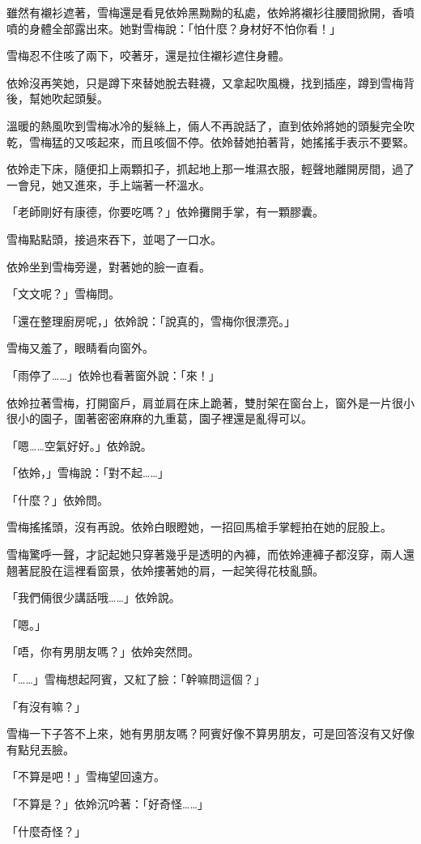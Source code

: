 雖然有襯衫遮著，雪梅還是看見依姈黑黝黝的私處，依姈將襯衫往腰間掀開，香噴噴的身體全部露出來。她對雪梅說：「怕什麼？身材好不怕你看！」

雪梅忍不住咳了兩下，咬著牙，還是拉住襯衫遮住身體。

依姈沒再笑她，只是蹲下來替她脫去鞋襪，又拿起吹風機，找到插座，蹲到雪梅背後，幫她吹起頭髮。

溫暖的熱風吹到雪梅冰冷的髮絲上，倆人不再說話了，直到依姈將她的頭髮完全吹乾，雪梅猛的又咳起來，而且咳個不停。依姈替她拍著背，她搖搖手表示不要緊。

依姈走下床，隨便扣上兩顆扣子，抓起地上那一堆濕衣服，輕聲地離開房間，過了一會兒，她又進來，手上端著一杯溫水。

「老師剛好有康德，你要吃嗎？」依姈攤開手掌，有一顆膠囊。

雪梅點點頭，接過來吞下，並喝了一口水。

依姈坐到雪梅旁邊，對著她的臉一直看。

「文文呢？」雪梅問。

「還在整理廚房呢，」依姈說：「說真的，雪梅你很漂亮。」

雪梅又羞了，眼睛看向窗外。

「雨停了……」依姈也看著窗外說：「來！」

依姈拉著雪梅，打開窗戶，肩並肩在床上跪著，雙肘架在窗台上，窗外是一片很小很小的園子，圍著密密麻麻的九重葛，園子裡還是亂得可以。

「嗯……空氣好好。」依姈說。

「依姈，」雪梅說：「對不起……」

「什麼？」依姈問。

雪梅搖搖頭，沒有再說。依姈白眼瞪她，一招回馬槍手掌輕拍在她的屁股上。

雪梅驚呼一聲，才記起她只穿著幾乎是透明的內褲，而依姈連褲子都沒穿，兩人還翹著屁股在這裡看窗景，依姈摟著她的肩，一起笑得花枝亂顫。

「我們倆很少講話哦……」依姈說。

「嗯。」

「唔，你有男朋友嗎？」依姈突然問。

「……」雪梅想起阿賓，又紅了臉：「幹嘛問這個？」

「有沒有嘛？」

雪梅一下子答不上來，她有男朋友嗎？阿賓好像不算男朋友，可是回答沒有又好像有點兒丟臉。

「不算是吧！」雪梅望回遠方。

「不算是？」依姈沉吟著：「好奇怪……」

「什麼奇怪？」

